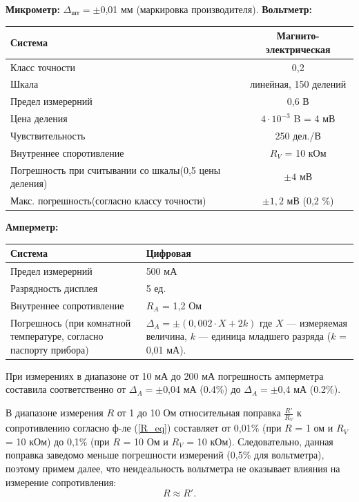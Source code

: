 \documentclass[12pt,a4paper]{article}
\begin{document}
{\bfseries Микрометр:} $\Delta _{шт} = \pm$0,01 мм (маркировка производителя).
\newpage
{\bfseries Вольтметр:} 
\begin{table}[h!]
\quad\quad
\begin{tabular}{|p{6cm}|c|}
\hline
Система & Магнито-электрическая \\ \hline
Класс точности & 0,2  \\ \hline
Шкала & линейная,
150 делений  \\ \hline
Предел измерерний & 0,6 В  \\ \hline
Цена деления & $4 \cdot 10^{-3}$ B = 4 мВ \\ \hline
Чувствительность & 250 дел./В \\ \hline
Внутреннее споротивление & $R_V$ = 10 кОм  \\ \hline
Погрешность при считывании \newline со шкалы(0,5 цены деления) & $\pm 4$ мВ \\ \hline
Макс. погрешность\newline (согласно классу точности) 
 & $\pm 1,2$ мВ (0,2 \%) \\ \hline
\end{tabular}
\end{table}

{\bfseries Амперметр:} 
\begin{table}[h]
\quad\quad
\begin{tabular}{|p{6cm}|p{6cm}|}
\hline
Система & Цифровая \\ \hline
Предел измерерний &  500 мА  \\ \hline
Разрядность дисплея & 5 ед. \\ \hline
Внутреннее сопротивление & $R_A$ = 1,2 Ом \\ \hline
Погрешнось (при комнатной
температуре, согласно паспорту
прибора) 
 & $\Delta _{A} = \pm (0,002 \cdot X + 2k)$ \newline где $X$ — измеряемая величина, $k$ — единица младшего разряда ($k$ = 0,01 мА). \\ \hline
\end{tabular}
\end{table}

При измерениях в диапазоне от 10 мА до 200 мА погрешность амперметра составила соответственно от $\Delta _{A} = \pm$0,04 мА (0.4\%) до $\Delta _{A} = \pm$0,4 мА (0.2\%).


В диапазоне измерения $R$ от 1 до 10 Ом относительная поправка $\frac{R'}{R_V}$ к сопротивлению согласно ф-ле (\ref{R_eq}) составляет от 0,01\% (при $R$ = 1 ом и $R_V$ = 10 кОм) до 0,1\% (при $R$ = 10 Ом и $R_V$ = 10 кОм). Следовательно, данная поправка заведомо меньше погрешности измерений (0,5\% для вольтметра), поэтому примем далее, что неидеальность вольтметра не оказывает влияния на измерение сопротивления:
\begin{equation}\label{Rarx_eq}
R \approx R'.
\end{equation}
\end{document}
